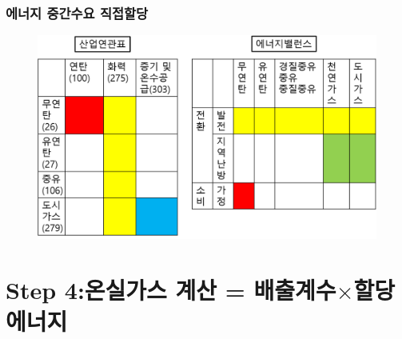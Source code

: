 \documentclass[10pt,compress,slidetop,%
			   hyperref={unicode},xcolor={svgnames},%
			   t]{beamer}
\begin{document}
\begin{frame}
	\frametitle{에너지 중간수요 직접할당}
	  	\begin{figure}
	\centering
	 \includegraphics[width=1.00\textwidth]{Espec.png}
	\end{figure}	
	
\end{frame}


\section{Step 4:온실가스 계산 = 배출계수$\times$할당 에너지  }
\end{document}
